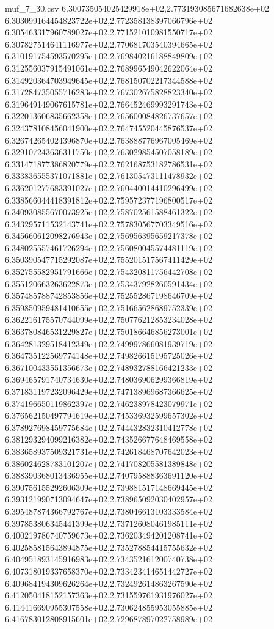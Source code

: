 \begin{filecontents*}{muf_7_30.csv}
6.300735054025429918e+02,2.773193085671682638e+02
6.303099164454823722e+02,2.772358138397066796e+02
6.305463317960789027e+02,2.771521010981550717e+02
6.307827514641116977e+02,2.770681703540394665e+02
6.310191754593570295e+02,2.769840216188849809e+02
6.312556037915491061e+02,2.768996549042622064e+02
6.314920364703949645e+02,2.768150702217344588e+02
6.317284735055716283e+02,2.767302675828823340e+02
6.319649149067615781e+02,2.766452469993291743e+02
6.322013606835662358e+02,2.765600084826737657e+02
6.324378108456041900e+02,2.764745520445876537e+02
6.326742654024396870e+02,2.763888776967005469e+02
6.329107243636311750e+02,2.763029854507058189e+02
6.331471877386820779e+02,2.762168753182786531e+02
6.333836555371071881e+02,2.761305473111478932e+02
6.336201277683391027e+02,2.760440014410296499e+02
6.338566044418391812e+02,2.759572377196800517e+02
6.340930855670073925e+02,2.758702561588461322e+02
6.343295711532143741e+02,2.757830567703349516e+02
6.345660612098276943e+02,2.756956395659217378e+02
6.348025557461726294e+02,2.756080045574481119e+02
6.350390547715292087e+02,2.755201517567411429e+02
6.352755582951791666e+02,2.754320811756442708e+02
6.355120663263622873e+02,2.753437928260591434e+02
6.357485788742853856e+02,2.752552867198646709e+02
6.359850959481410655e+02,2.751665628689752339e+02
6.362216175570744099e+02,2.750776212853234028e+02
6.363780846531229827e+02,2.750186646856273001e+02
6.364281329518412349e+02,2.749997866081939719e+02
6.364735122569774148e+02,2.749826615195725026e+02
6.367100433551356673e+02,2.748932788166421233e+02
6.369465791740734630e+02,2.748036906299366819e+02
6.371831197232096429e+02,2.747138969687366625e+02
6.374196650119862397e+02,2.746238978423079971e+02
6.376562150497794619e+02,2.745336932599657302e+02
6.378927698459775684e+02,2.744432832310412778e+02
6.381293294099216382e+02,2.743526677648469558e+02
6.383658937509321731e+02,2.742618468707642023e+02
6.386024628783101207e+02,2.741708205581389848e+02
6.388390368013436955e+02,2.740795888363691120e+02
6.390756155292606309e+02,2.739881517148669445e+02
6.393121990713094647e+02,2.738965092030402957e+02
6.395487874366792767e+02,2.738046613103333584e+02
6.397853806345441399e+02,2.737126080461985111e+02
6.400219786740759673e+02,2.736203494201208741e+02
6.402585815643894875e+02,2.735278854415755632e+02
6.404951893145916983e+02,2.734352161200740738e+02
6.407318019337658370e+02,2.733423414651442727e+02
6.409684194309626264e+02,2.732492614863267590e+02
6.412050418152157363e+02,2.731559761931976027e+02
6.414416690955307558e+02,2.730624855953055885e+02
6.416783012808915601e+02,2.729687897022758989e+02

\end{filecontents*}
